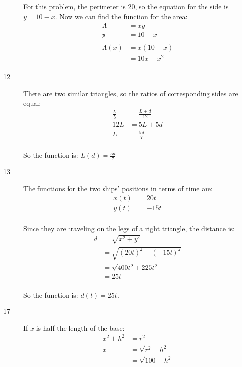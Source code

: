 \documentclass{exam}
\begin{document}
\begin{description}
      For this problem, the perimeter is 20, so the equation for the side is $y = 10 - x$.  Now we can find the function
      for the area:
      \begin{align*}
        A    &= xy \\
        y    &= 10 - x \\
        \\
        A(x) &= x(10 - x) \\
             &= 10x - x^2 \\
      \end{align*}

    \item[12]
      There are two similar triangles, so the ratios of corresponding sides are equal:
      \begin{align*}
        \frac{L}{5} &= \frac{L + d}{12} \\
        12L         &= 5L + 5d \\
        L           &= \frac{5d}{7} \\
      \end{align*}

      So the function is: $L(d) = \frac{5d}{7}$

    \pagebreak

    \item[13]
      The functions for the two ships' positions in terms of time are:
      \begin{align*}
        x(t) &= 20t \\
        y(t) &= -15t \\
      \end{align*}

      Since they are traveling on the legs of a right triangle, the distance is:
      \begin{align*}
        d &= \sqrt{x^2 + y^2} \\
          &= \sqrt{(20t)^2 + (-15t)^2} \\
          &= \sqrt{400t^2 + 225t^2} \\
          &= 25t \\
      \end{align*}

      So the function is: $d(t) = 25t$.

    \item[17]
      If $x$ is half the length of the base:
      \begin{align*}
        x^2 + h^2 &= r^2 \\
        x         &= \sqrt{r^2 - h^2} \\
                  &= \sqrt{100 - h^2} \\
      \end{align*}


\end{description}
\end{document}

